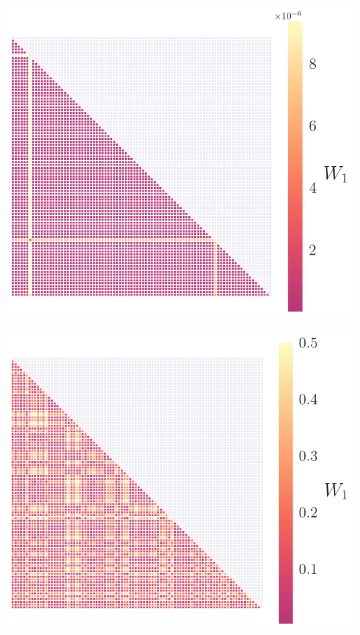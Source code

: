 \documentclass[fleqn,usenatbib,useAMS]{mnras}
\providecommand{\DIFadd}[1]{{\protect\color{blue}\uwave{#1}}} %
\providecommand{\DIFaddFL}[1]{\DIFadd{#1}} %
\begin{document}
\begin{figure}

	\begin{subfigure}[b]{0.22\textwidth}
		\includegraphics[width=\textwidth]{images/WD_0}
		\caption{\DIFaddFL{$\Omega$}}
	\end{subfigure}
	\hfill
	\begin{subfigure}[b]{0.22\textwidth}
		\includegraphics[width=\textwidth]{images/WD_1}

\end{subfigure}
\end{figure}
\end{document}
